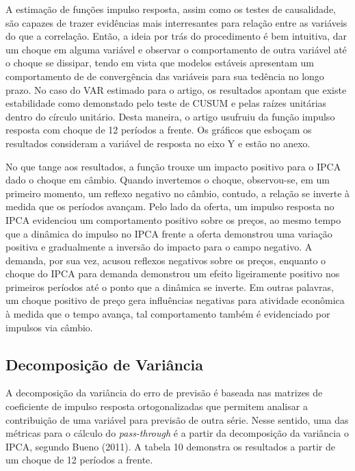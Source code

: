\documentclass[12pt]{article}
\begin{document}
A estimação de funções impulso resposta, assim como os testes de
causalidade, são capazes de trazer evidências mais interresantes para
relação entre as variáveis do que a correlação. Então, a ideia por trás
do procedimento é bem intuitiva, dar um choque em alguma variável e
observar o comportamento de outra variável até o choque se dissipar,
tendo em vista que modelos estáveis apresentam um comportamento de de
convergência das variáveis para sua tedência no longo prazo. No caso do
VAR estimado para o artigo, os resultados apontam que existe
estabilidade como demonstado pelo teste de CUSUM e pelas raízes
unitárias dentro do círculo unitário. Desta maneira, o artigo usufruiu
da função impulso resposta com choque de 12 períodos a frente. Os
gráficos que esboçam os resultados consideram a variável de resposta no
eixo Y e estão no anexo.

No que tange aos resultados, a função trouxe um impacto positivo para o
IPCA dado o choque em câmbio. Quando invertemos o choque, observou-se,
em um primeiro momento, um reflexo negativo no câmbio, contudo, a
relação se inverte à medida que os períodos avançam. Pelo lado da
oferta, um impulso resposta no IPCA evidenciou um comportamento positivo
sobre os preços, ao mesmo tempo que a dinâmica do impulso no IPCA frente
a oferta demonstrou uma variação positiva e gradualmente a inversão do
impacto para o campo negativo. A demanda, por sua vez, acusou reflexos
negativos sobre os preços, enquanto o choque do IPCA para demanda
demonstrou um efeito ligeiramente positivo nos primeiros períodos até o
ponto que a dinâmica se inverte. Em outras palavras, um choque positivo
de preço gera influências negativas para atividade econômica à medida
que o tempo avança, tal comportamento também é evidenciado por impulsos
via câmbio.

\hypertarget{decomposiuxe7uxe3o-de-variuxe2ncia}{%
\subsection{Decomposição de
Variância}\label{decomposiuxe7uxe3o-de-variuxe2ncia}}

A decomposição da variância do erro de previsão é baseada nas matrizes
de coeficiente de impulso resposta ortogonalizadas que permitem analisar
a contribuição de uma variável para previsão de outra série. Nesse
sentido, uma das métricas para o cálculo do \emph{pass-through} é a
partir da decomposição da variância o IPCA, segundo Bueno (2011). A
tabela 10 demonstra os resultados a partir de um choque de 12 períodos a
frente.
\end{document}
